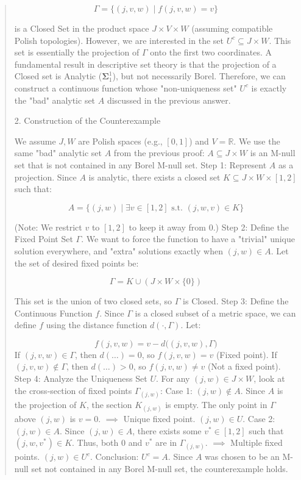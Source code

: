 \begin{Rem}
{\begin{quote}
$$\Gamma = \{ (j, v, w) \mid f(j, v, w) = v \}$$

is a Closed Set in the product space $J \times V \times W$ (assuming compatible Polish topologies).
However, we are interested in the set $U^c \subseteq J \times W$. This set is essentially the projection of $\Gamma$ onto the first two coordinates. A fundamental result in descriptive set theory is that the projection of a Closed set is Analytic ($\mathbf{\Sigma}^1_1$), but not necessarily Borel.
Therefore, we can construct a continuous function whose "non-uniqueness set" $U^c$ is exactly the "bad" analytic set $A$ discussed in the previous answer.

2. Construction of the Counterexample

We assume $J, W$ are Polish spaces (e.g., $[0,1]$) and $V = \mathbb{R}$. We use the same "bad" analytic set $A$ from the previous proof: $A \subseteq J \times W$ is an M-null set that is not contained in any Borel M-null set.
Step 1: Represent $A$ as a projection.
Since $A$ is analytic, there exists a closed set $K \subseteq J \times W \times [1, 2]$ such that:


$$A = \{ (j, w) \mid \exists v \in [1, 2] \text{ s.t. } (j, w, v) \in K \}$$

(Note: We restrict $v$ to $[1,2]$ to keep it away from $0$.)
Step 2: Define the Fixed Point Set $\Gamma$.
We want to force the function to have a "trivial" unique solution everywhere, and "extra" solutions exactly when $(j, w) \in A$.
Let the set of desired fixed points be:


$$\Gamma = K \cup \left( J \times W \times \{0\} \right)$$

This set is the union of two closed sets, so $\Gamma$ is Closed.
Step 3: Define the Continuous Function $f$.
Since $\Gamma$ is a closed subset of a metric space, we can define $f$ using the distance function $d(\cdot, \Gamma)$. Let:


$$f(j, v, w) = v - d\big((j, v, w), \Gamma\big)$$
If $(j, v, w) \in \Gamma$, then $d(\dots) = 0$, so $f(j, v, w) = v$ (Fixed point).
If $(j, v, w) \notin \Gamma$, then $d(\dots) > 0$, so $f(j, v, w) \neq v$ (Not a fixed point).
Step 4: Analyze the Uniqueness Set $U$.
For any $(j, w) \in J \times W$, look at the cross-section of fixed points $\Gamma_{(j,w)}$:
Case 1: $(j, w) \notin A$.
Since $A$ is the projection of $K$, the section $K_{(j,w)}$ is empty. The only point in $\Gamma$ above $(j, w)$ is $v=0$.
$\implies$ Unique fixed point. $(j, w) \in U$.
Case 2: $(j, w) \in A$.
Since $(j, w) \in A$, there exists some $v^* \in [1, 2]$ such that $(j, w, v^*) \in K$.
Thus, both $0$ and $v^*$ are in $\Gamma_{(j,w)}$.
$\implies$ Multiple fixed points. $(j, w) \in U^c$.
Conclusion:
$U^c = A$.
Since $A$ was chosen to be an M-null set not contained in any Borel M-null set, the counterexample holds.


\end{quote}}
\end{Rem}
